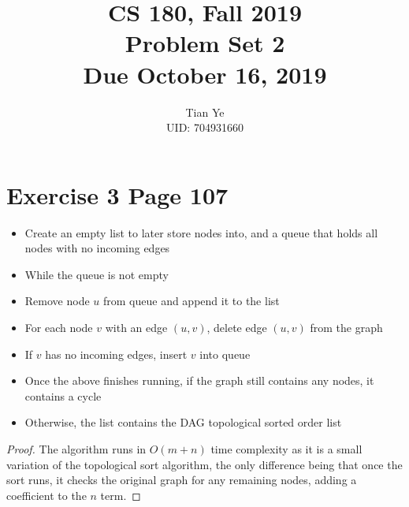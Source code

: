 \documentclass[11pt]{article}
\newcommand{\cnum}{CS 180}
\newcommand{\ced}{Fall 2019}
\newcommand{\ctitle}[3]{\title{\vspace{-0.5in}\cnum, \ced\\Problem Set #1 #2\\Due #3}}
\begin{document}
\ctitle{2}{}{October 16, 2019}
\author{Tian Ye \\ \small{UID: 704931660}}
\maketitle

\newpage

\section*{Exercise 3 Page 107}
\begin{itemize}
\item Create an empty list to later store nodes into, and a queue that holds all nodes with no incoming edges
\item While the queue is not empty
\item Remove node $u$ from queue and append it to the list
\item For each node $v$ with an edge $(u,v)$, delete edge $(u,v)$ from the graph
\item If $v$ has no incoming edges, insert $v$ into queue
\item Once the above finishes running, if the graph still contains any nodes, it contains a cycle
\item Otherwise, the list contains the DAG topological sorted order list
\end{itemize}
\begin{proof}
The algorithm runs in $O(m+n)$ time complexity as it is a small variation of the topological sort algorithm, the only difference being that once the sort runs, it checks the original graph for any remaining nodes, adding a coefficient to the $n$ term.
\end{proof}
\newpage
\end{document}
